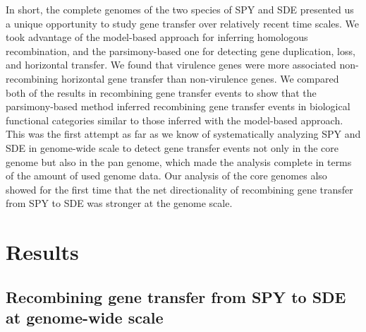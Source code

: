 \documentclass[10pt]{article}
\begin{document}
In short, the complete genomes of the two species of SPY and SDE presented us a
unique opportunity to study gene transfer over relatively recent time scales.
We took advantage of the model-based approach for inferring homologous
recombination, and the parsimony-based one for detecting gene duplication, loss,
and horizontal transfer.  We found that virulence genes were more associated
non-recombining horizontal gene transfer than non-virulence genes.  We compared
both of the results in recombining gene transfer events to show that the
parsimony-based method inferred recombining gene transfer events in biological
functional categories similar to those inferred with the model-based approach.
This was the first attempt as far as we know of systematically analyzing SPY and
SDE in genome-wide scale to detect gene transfer events not only in the core
genome but also in the pan genome, which made the analysis complete in terms of
the amount of used genome data. Our analysis of the core genomes also showed for
the first time that the net directionality of recombining gene transfer from SPY
to SDE was stronger at the genome scale.

\section*{Results}


\subsection*{Recombining gene transfer from SPY to SDE at genome-wide scale}
\end{document}
